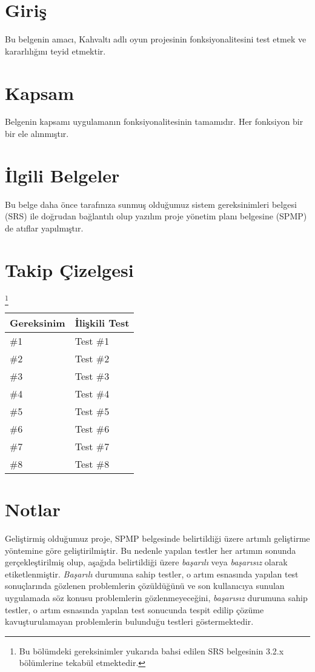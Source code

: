 \documentclass[12pt,a4paper]{article}
\begin{document}
   
   \newpage

   \tableofcontents
   \newpage


   \section{Giriş}
   Bu belgenin amacı, Kahvaltı adlı oyun projesinin fonksiyonalitesini test etmek ve kararlılığını teyid etmektir.

   \section{Kapsam}
   Belgenin kapsamı uygulamanın fonksiyonalitesinin tamamıdır. Her fonksiyon bir bir ele alınmıştır.

   \section{İlgili Belgeler}
   Bu belge daha önce tarafınıza sunmuş olduğumuz sistem gereksinimleri belgesi (SRS) ile doğrudan bağlantılı olup yazılım proje yönetim planı belgesine (SPMP) de atıflar yapılmıştır.

   \section{Takip Çizelgesi}\footnote{Bu bölümdeki gereksinimler yukarıda bahsi edilen SRS belgesinin 3.2.x bölümlerine tekabül etmektedir.}
   \begin{tabular}{ | l | l | }
   \hline
   Gereksinim & İlişkili Test \\ \hline
   \#1 & Test \#1 \\ \hline
   \#2 & Test \#2 \\ \hline
   \#3 & Test \#3 \\ \hline
   \#4 & Test \#4 \\ \hline
   \#5 & Test \#5 \\ \hline 
   \#6 & Test \#6 \\ \hline
   \#7 & Test \#7 \\ \hline
   \#8 & Test \#8 \\ \hline
   \end{tabular}

   \section{Notlar} \label{notes}
   Geliştirmiş olduğumuz proje, SPMP belgesinde belirtildiği üzere artımlı geliştirme yöntemine göre geliştirilmiştir. Bu nedenle yapılan testler her artımın sonunda gerçekleştirilmiş olup, aşağıda belirtildiği üzere \textit{başarılı} veya \textit{başarısız} olarak etiketlenmiştir. \textit{Başarılı} durumuna sahip testler, o artım esnasında yapılan test sonuçlarında gözlenen problemlerin çözüldüğünü ve son kullanıcıya sunulan uygulamada söz konusu problemlerin gözlenmeyeceğini, \textit{başarısız} durumuna sahip testler, o artım esnasında yapılan test sonucunda tespit edilip çözüme kavuşturulamayan problemlerin bulunduğu testleri göstermektedir.
\end{document}
